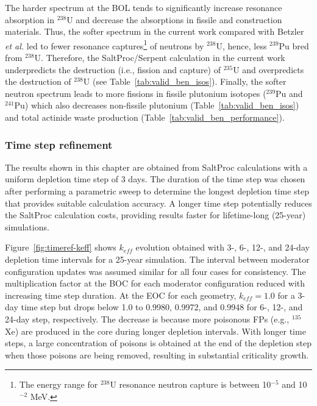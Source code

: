 The harder spectrum at the \gls{BOL} tends to significantly increase resonance 
absorption in $^{238}$U and decrease the absorptions in fissile and 
construction materials. Thus, the softer spectrum in the current work compared 
with Betzler \emph{et al.} led to fewer resonance captures\footnote{The energy 
range for $^{238}$U resonance neutron capture is between 10$^{-5}$ and 
10$^{-2}$ MeV.} of neutrons by $^{238}$U, hence, less $^{239}$Pu bred from 
$^{238}$U. Therefore, the SaltProc/Serpent calculation in the current work 
underpredicts the destruction (i.e., fission and capture) of $^{235}$U and 
overpredicts the destruction of $^{238}$U (see 
Table~\ref{tab:valid_ben_isos}). 
Finally, the softer neutron spectrum leads to more fissions in fissile 
plutonium isotopes ($^{239}$Pu and $^{241}$Pu) which also decreases 
non-fissile plutonium (Table~\ref{tab:valid_ben_isos}) and total actinide 
waste production (Table~\ref{tab:valid_ben_performance}).


\subsubsection{Time step refinement}\label{sec:time-refinement}
The results shown in this chapter are obtained from SaltProc calculations with 
a uniform depletion time step of 3 days. The duration of the time step was 
chosen after performing a parametric sweep to determine the longest depletion 
time step that provides suitable calculation accuracy. A longer time 
step potentially reduces the SaltProc calculation costs, providing results 
faster for lifetime-long (25-year) simulations. 

Figure~\ref{fig:timeref-keff} shows $k_{eff}$ evolution obtained with 3-, 6-, 
12-, and 24-day depletion time intervals for a 25-year simulation. The 
interval between moderator configuration updates was assumed similar for all 
four cases for consistency. The multiplication factor at the \gls{BOC} for 
each moderator configuration reduced with increasing time step duration. At 
the \gls{EOC} for each geometry, $k_{eff}=1.0$ for a 3-day time step but 
drops below 1.0 to 0.9980, 0.9972, and 0.9948 for 6-, 12-, and 24-day step, 
respectively. 
The 
decrease is because more poisonous \glspl{FP} (e.g., $^{135}$Xe) are produced 
in the core during longer depletion intervals. With longer time steps, a large 
concentration of poisons is obtained at the end of the depletion step when 
those poisons are being removed, resulting in substantial criticality 
growth. 

